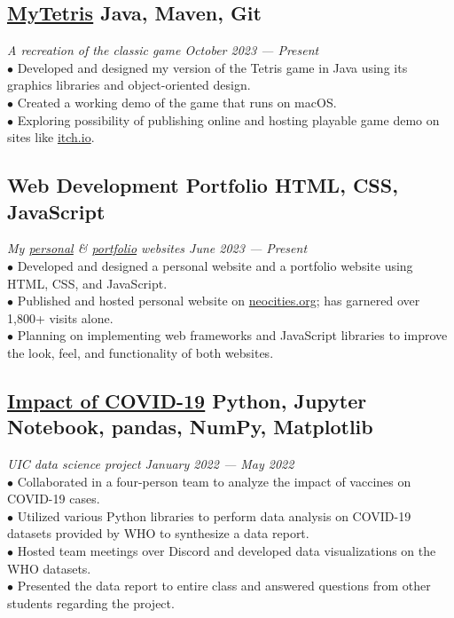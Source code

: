 \documentclass{article}
\begin{document}
\subsection{\href{https://github.com/IanLulu/MyTetris}{\underline{MyTetris}} \hfill \textnormal{Java, Maven, Git}}
\vspace{-0.5em}
\textit{A recreation of the classic game \hfill October 2023 --- Present}
\\
$\bullet$ Developed and designed my version of the Tetris game in Java using its graphics libraries and object-oriented design.
\\
$\bullet$ Created a working demo of the game that runs on macOS.
\\
$\bullet$ Exploring possibility of publishing online and hosting playable game demo on sites like \url{itch.io}.
\vspace{-0.5em}

\subsection{Web Development Portfolio \hfill \textnormal{HTML, CSS, JavaScript}}
\vspace{-0.5em}
\textit{My \href{https://github.com/IanLulu/neocities-website}{\underline{personal}} \& \href{https://github.com/IanLulu/ianlulu.github.io}{\underline{portfolio}} websites \hfill June 2023 --- Present}
\\
$\bullet$ Developed and designed a personal website and a portfolio website using HTML, CSS, and JavaScript.
\\
$\bullet$ Published and hosted personal website on \url{neocities.org}; has garnered over 1,800+ visits alone.
\\
$\bullet$ Planning on implementing web frameworks and JavaScript libraries to improve the look, feel, and functionality of both websites.
\vspace{-0.5em}

\subsection{\href{https://github.com/uic-cs418/cs418-spring22-the-wild-card}{\underline{Impact of COVID-19}} \hfill \textnormal{Python, Jupyter Notebook, pandas, NumPy, Matplotlib}}
\vspace{-0.5em}
\textit{UIC data science project \hfill January 2022 --- May 2022}
\\
$\bullet$ Collaborated in a four-person team to analyze the impact of vaccines on COVID-19 cases.
\\
$\bullet$ Utilized various Python libraries to perform data analysis on COVID-19 datasets provided by WHO to synthesize a data report.
\\
$\bullet$ Hosted team meetings over Discord and developed data visualizations on the WHO datasets.
\\
$\bullet$ Presented the data report to entire class and answered questions from other students regarding the project.
\end{document}
